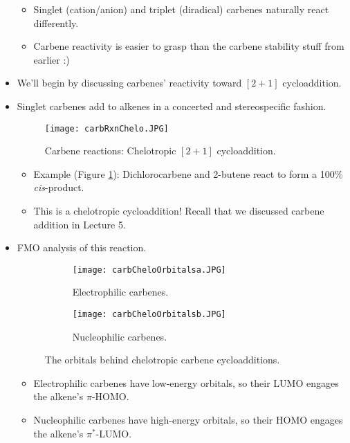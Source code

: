 \documentclass[../notes.tex]{subfiles}
\begin{document}
\begin{itemize}
\begin{itemize}
        \item Singlet (cation/anion) and triplet (diradical) carbenes naturally react differently.
        \item Carbene reactivity is easier to grasp than the carbene stability stuff from earlier :)
    \end{itemize}
    \item We'll begin by discussing carbenes' reactivity toward $[2+1]$ cycloaddition.
    \item Singlet carbenes add to alkenes in a concerted and stereospecific fashion.
    \begin{figure}[H]
        \centering
        \texttt{[image: carbRxnChelo.JPG]}
        \caption{Carbene reactions: Chelotropic $[2+1]$ cycloaddition.}
        \label{fig:carbRxnChelo}
    \end{figure}
    \begin{itemize}
        \item Example (Figure \ref{fig:carbRxnChelo}): Dichlorocarbene and 2-butene react to form a 100\% \emph{cis}-product.
        \item This is a chelotropic cycloaddition! Recall that we discussed carbene addition in Lecture 5.
    \end{itemize}
    \item FMO analysis of this reaction.
    \begin{figure}[h!]
        \centering
        \begin{subfigure}[b]{0.4\linewidth}
            \centering
            \texttt{[image: carbCheloOrbitalsa.JPG]}
            \caption{Electrophilic carbenes.}
            \label{fig:carbCheloOrbitalsa}
        \end{subfigure}
        \begin{subfigure}[b]{0.4\linewidth}
            \centering
            \texttt{[image: carbCheloOrbitalsb.JPG]}
            \caption{Nucleophilic carbenes.}
            \label{fig:carbCheloOrbitalsb}
        \end{subfigure}
        \caption{The orbitals behind chelotropic carbene cycloadditions.}
        \label{fig:carbCheloOrbitals}
    \end{figure}
    \begin{itemize}
        \item Electrophilic carbenes have low-energy orbitals, so their LUMO engages the alkene's $\pi$-HOMO.
        \item Nucleophilic carbenes have high-energy orbitals, so their HOMO engages the alkene's $\pi^*$-LUMO.

\end{itemize}
\end{itemize}
\end{document}
